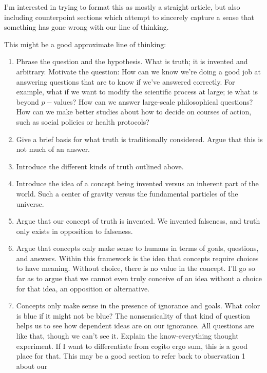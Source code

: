 \documentclass[11pt, oneside]{article}   	%
\begin{document}
I'm interested in trying to format this as mostly a straight article, but also
including counterpoint sections which attempt to sincerely capture a sense that
something has gone wrong with our line of thinking.

This might be a good approximate line of thinking:
\begin{enumerate}
    \item Phrase the question and the hypothesis. What is truth; it is invented
        and arbitrary. Motivate the question: How can we know we're doing a good
        job at answering questions that are to know if we've answered correctly.
        For example, what if we want to modify the scientific process at large;
        ie what is beyond $p-$values? How can we answer large-scale
        philosophical questions? How can we make better studies about how to
        decide on courses of action, such as social policies or health
        protocols?
    \item Give a brief basis for what truth is traditionally considered. Argue
        that this is not much of an answer.
    \item Introduce the different kinds of truth outlined above.
    \item Introduce the idea of a concept being invented versus an inherent part
        of the world. Such a center of gravity versus the fundamental particles
        of the universe.
    \item Argue that our concept of truth is invented. We invented falseness,
        and truth only exists in opposition to falseness.
    \item Argue that concepts only make sense to humans in terms of goals,
        questions, and answers. Within this framework is the idea that concepts
        require choices to have meaning. Without choice, there is no value in
        the concept. I'll go so far as to argue that we cannot even truly
        conceive of an idea without a choice for that idea, an opposition or
        alternative.
    \item Concepts only make sense in the presence of ignorance and goals.
        What color is blue if it might not be blue? The nonsensicality of that
        kind of question helps us to see how dependent ideas are on our
        ignorance. All questions are like that, though we can't see it. Explain
        the know-everything thought experiment. If I want to differentiate from
        cogito ergo sum, this is a good place for that.
        This may be a good section to refer back to observation 1 about our

\end{enumerate}
\end{document}
